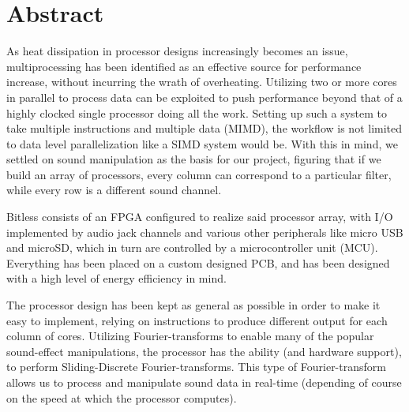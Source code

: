 \section*{Abstract}
As heat dissipation in processor designs increasingly becomes an issue,
multiprocessing has been identified as an effective source for performance
increase, without incurring the wrath of overheating. Utilizing two or more
cores in parallel to process data can be exploited to push performance beyond
that of a highly clocked single processor doing all the work. Setting up such
a system to take multiple instructions and multiple data (MIMD), the workflow
is not limited to data level parallelization like a SIMD system would be. With
this in mind, we settled on sound manipulation as the basis for our project,
figuring that if we build an array of processors, every column can correspond
to a particular filter, while every row is a different sound channel.
\newline

Bitless consists of an FPGA configured to realize said processor array, with
I/O implemented by audio jack channels and various other peripherals like micro
USB and microSD, which in turn are controlled by a microcontroller unit (MCU).
Everything has been placed on a custom designed PCB, and has been designed with
a high level of energy efficiency in mind.
\newline

The processor design has been kept as general as possible in order to make it
easy to implement, relying on instructions to produce different output for each
column of cores. Utilizing Fourier-transforms to enable many of the popular
sound-effect manipulations, the processor has the ability (and hardware
support), to perform Sliding-Discrete Fourier-transforms. This type of
Fourier-transform allows us to process and manipulate sound data in
real-time (depending of course on the speed at
which the processor computes).
\newline

